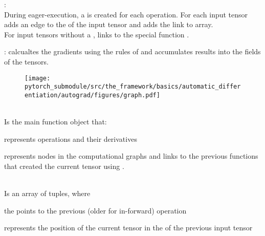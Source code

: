 \begin{sectionbox}\nospacing
    \begin{circlelistnosep}
        \item
    :\\
    During eager-execution, a  is created for each operation.
    For each input tensor  adds an edge to the  of the input tensor and adds the link to  array.\\
    For input tensors without a ,  links to the special function .
    \item {}:
     calcualtes the gradients using the rules of  and accumulates results into the  fields of the tensors.
    \end{circlelistnosep}
    \begin{figure}[H]
        \centering
        \texttt{[image: pytorch\_submodule/src/the\_framework/basics/automatic\_differentiation/autograd/figures/graph.pdf]}
    \end{figure}
\end{sectionbox}
\begin{defnbox}\nospacing
    \begin{defn}\leavevmode\\
        Is the main function object that:
        \begin{itemizenosep}
            \item represents operations and their derivatives
            \item represents nodes in the computational graphs and links to the previous functions that created the current tensor using .
        \end{itemizenosep}
    \end{defn}
\end{defnbox}
\begin{defnbox}\nospacing
    \begin{defn}\leavevmode\\
        Is an array of  tuples, where
        \begin{itemizenosep}
            \item the  points to the previous (older for in-forward) operation
            \item {} represents the position of the current tensor in the  of the previous input tensor
        \end{itemizenosep}
    \end{defn}
\end{defnbox}
